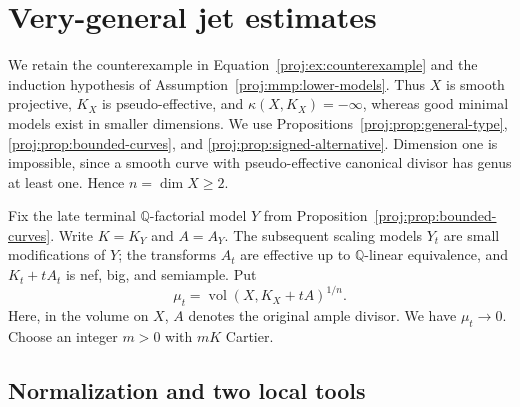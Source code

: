 \documentclass[11pt,letterpaper]{article}
\newcommand{\Q}{\mathbb{Q}}
\DeclareMathOperator{\vol}{vol}
\theoremstyle{definition}
\theoremstyle{remark}
\begin{document}
\section{Very-general jet estimates}\label{proj:sec:jets}

We retain the counterexample in Equation~\eqref{proj:ex:counterexample}
and the induction hypothesis of Assumption~\ref{proj:mmp:lower-models}.
Thus \(X\) is smooth projective,
\(K_X\) is pseudo-effective, and \(\kappa(X,K_X)=-\infty\), whereas
good minimal models exist in smaller dimensions.  We use
Propositions~\ref{proj:prop:general-type}, \ref{proj:prop:bounded-curves}, and
\ref{proj:prop:signed-alternative}.  Dimension one is impossible, since a
smooth curve with pseudo-effective canonical divisor has genus at least
one.  Hence \(n=\dim X\ge2\).

Fix the late terminal \(\Q\)-factorial model \(Y\) from
Proposition~\ref{proj:prop:bounded-curves}.  Write \(K=K_Y\) and \(A=A_Y\).
The subsequent scaling models \(Y_t\) are small modifications of \(Y\);
the transforms \(A_t\) are effective up to \(\Q\)-linear equivalence,
and \(K_t+tA_t\) is nef, big, and semiample.  Put
\[
 \mu_t=\vol(X,K_X+tA)^{1/n}.
\]
Here, in the volume on \(X\), \(A\) denotes the original ample divisor.
We have \(\mu_t\to0\).  Choose an integer \(m>0\) with \(mK\) Cartier.

\subsection{Normalization and two local tools}
\end{document}
